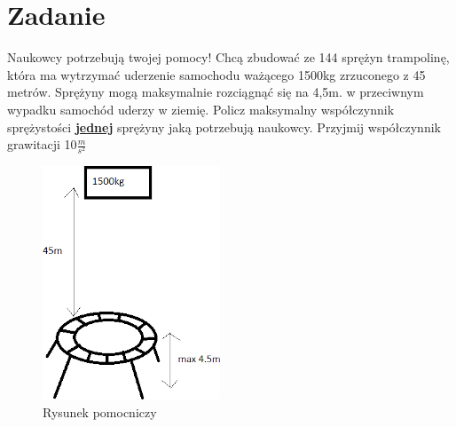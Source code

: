 \documentclass[14pt]{extarticle}
\begin{document}
    \section{Zadanie}
    \begin{flushleft}
        Naukowcy potrzebują twojej pomocy! Chcą zbudować ze 144 sprężyn trampolinę, która ma wytrzymać uderzenie samochodu ważącego 1500kg zrzuconego z 45 metrów.
        Sprężyny mogą maksymalnie rozciągnąć się na 4,5m. w przeciwnym wypadku samochód uderzy w ziemię.
        Policz maksymalny współczynnik sprężystości \textbf{\underline{jednej}} sprężyny jaką potrzebują naukowcy.
        Przyjmij współczynnik grawitacji 10$\frac{m}{s^2}$
    \end{flushleft}
    \begin{figure}[H]
        \centering
        \includegraphics{trampolina}
        \caption{Rysunek pomocniczy}
    \end{figure}
    \clearpage
\end{document}
